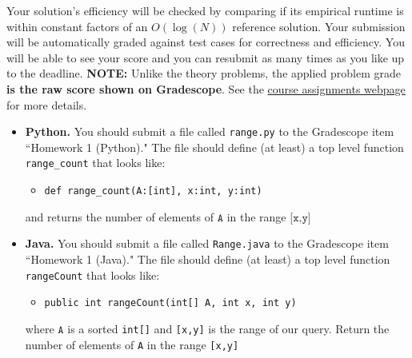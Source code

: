 \documentclass[11pt]{article}
\begin{document}
Your solution's efficiency will be checked by comparing if its empirical 
runtime is within constant factors of an $O(\log(N))$ reference solution. Your
submission will be automatically graded against test cases for correctness and
efficiency. You will be able to see your score and you can resubmit as many 
times as you like up to the deadline. \textbf{NOTE:} Unlike the theory problems,
the applied problem grade \textbf{is the raw score shown on Gradescope}. See the
\href{https://sites.duke.edu/spring24compsci330/assignments/}{course assignments webpage} for more details. 

\begin{itemize}
	\item \textbf{Python.} You should submit a file called \texttt{range.py}
            to the Gradescope item ``Homework 1 (Python)." The file should 
            define (at least) a top level function \texttt{range\_count} that
            looks like: 
    \begin{itemize}
        \item \verb|def range_count(A:[int], x:int, y:int)|
    \end{itemize}

	and returns the number of elements of $\texttt{A}$ in the range
        $\texttt{[x,y]}$
	
    \item \textbf{Java.} You should submit a file called \texttt{Range.java} to
        the Gradescope item ``Homework 1 (Java)." The file should define (at
        least) a top level function \texttt{rangeCount} that looks like: 
    \begin{itemize}
        \item \verb|public int rangeCount(int[] A, int x, int y)|
    \end{itemize}
    where $\texttt{A}$ is a sorted \verb|int[]| and \verb|[x,y]| is the range of
    our query. Return the number of elements of \verb|A| in the range 
    \verb|[x,y]| 
\end{itemize}
\end{document}
